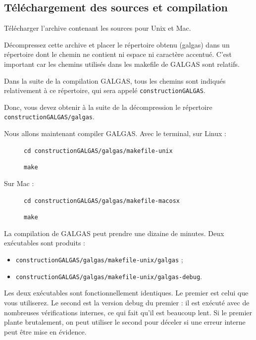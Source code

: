\subsection{Téléchargement des sources et compilation}

Télécharger l’archive contenant les sources pour Unix et Mac.

Décompressez cette archive et placer le répertoire obtenu (galgas) dans un répertoire dont le chemin ne contient ni espace ni caractère accentué. C'est important car les chemins utilisés dans les makefile de GALGAS sont relatifs.

Dans la suite de la compilation GALGAS, tous les chemins sont indiqués relativement à ce répertoire, qui sera appelé \texttt{constructionGALGAS}.

Donc, vous devez obtenir à la suite de la décompression le répertoire \texttt{constructionGALGAS/galgas}.

Nous allons maintenant compiler GALGAS. Avec le terminal, sur Linux :
\begin{description}
  \item[ ] \texttt{cd constructionGALGAS/galgas/makefile-unix}
  \item[ ] \texttt{make}
\end{description}

Sur Mac :
\begin{description}
  \item[ ] \texttt{cd constructionGALGAS/galgas/makefile-macosx}
  \item[ ] \texttt{make}
\end{description}

La compilation de GALGAS peut prendre une dizaine de minutes. Deux exécutables sont produits :

\begin{itemize}
  \item \texttt{constructionGALGAS/galgas/makefile-unix/galgas} ;
  \item \texttt{constructionGALGAS/galgas/makefile-unix/galgas-debug}.
\end{itemize}

Les deux exécutables sont fonctionnellement identiques. Le premier est celui que vous utiliserez. Le second est la version debug du premier : il est exécuté avec de nombreuses vérifications internes, ce qui fait qu’il est beaucoup lent. Si le premier plante brutalement, on peut utiliser le second pour déceler si une erreur interne peut être mise en évidence.

